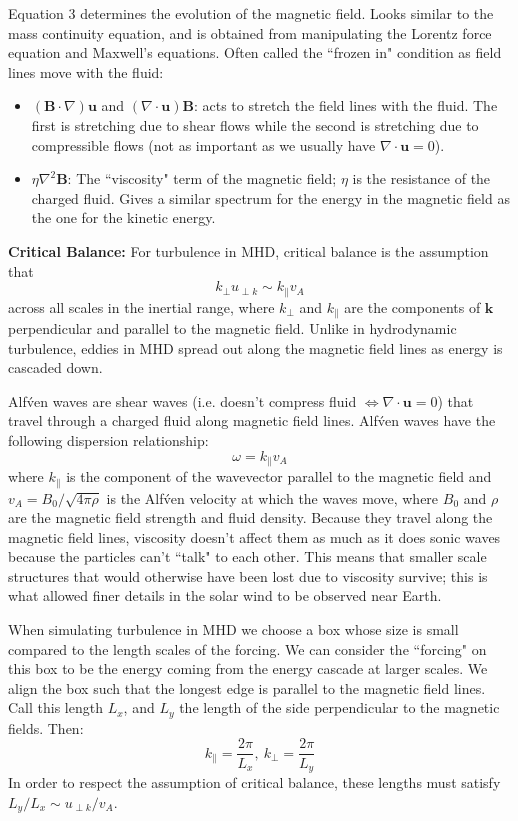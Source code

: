 \documentclass[12pt,letterpaper]{article}
\newcommand{\B}[1]{\mathbf{#1}}
\begin{document}
  Equation 3 determines the evolution of the magnetic field. Looks similar to the mass continuity equation, and is obtained from manipulating the Lorentz force equation and Maxwell's equations. Often called the ``frozen in" condition as field lines move with the fluid:
  \begin{itemize}
    \item $(\B{B}\cdot\nabla)\B{u}$ and $(\nabla\cdot \B{u})\B{B}$: acts to stretch the field lines with the fluid. The first is stretching due to shear flows while the second is stretching due to compressible flows (not as important as we usually have $\nabla\cdot\B{u} = 0$).

    \item $\eta \nabla^2\B{B}$: The ``viscosity" term of the magnetic field; $\eta$ is the resistance of the charged fluid. Gives a similar spectrum for the energy in the magnetic field as the one for the kinetic energy.
  \end{itemize}

  \textbf{Critical Balance:} For turbulence in MHD, critical balance is the assumption that
  $$
    k_\perp u_{\perp k} \sim k_\| v_A
  $$
  across all scales in the inertial range, where $k_\perp$ and $k_\|$ are the components of $\B{k}$ perpendicular and parallel to the magnetic field. Unlike in hydrodynamic turbulence, eddies in MHD spread out along the magnetic field lines as energy is cascaded down.

  Alf\'ven waves are shear waves (i.e. doesn't compress fluid $\iff \nabla\cdot\B{u}=0$) that travel through a charged fluid along magnetic field lines. Alf\'ven waves have the following dispersion relationship:
  $$
    \omega = k_\| v_A
  $$
  where $k_\|$ is the component of the wavevector parallel to the magnetic field and $v_A = B_0 / \sqrt{4\pi \rho}$ is the Alf\'ven velocity at which the waves move, where $B_0$ and $\rho$ are the magnetic field strength and fluid density. Because they travel along the magnetic field lines, viscosity doesn't affect them as much as it does sonic waves because the particles can't ``talk" to each other. This means that smaller scale structures that would otherwise have been lost due to viscosity survive; this is what allowed finer details in the solar wind to be observed near Earth.

  When simulating turbulence in MHD we choose a box whose size is small compared to the length scales of the forcing. We can consider the ``forcing" on this box to be the energy coming from the energy cascade at larger scales. We align the box such that the longest edge is parallel to the magnetic field lines. Call this length $L_x$, and $L_y$ the length of the side perpendicular to the magnetic fields. Then:
  $$
    k_\| = \frac{2\pi}{L_x}, \ k_\perp = \frac{2\pi}{L_y}
  $$
  In order to respect the assumption of critical balance, these lengths must satisfy
  $L_y/L_x \sim u_{\perp k}/v_A$.
\end{document}
